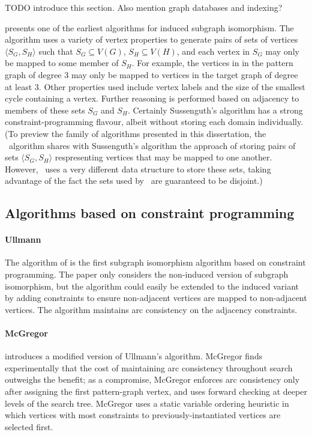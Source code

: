 TODO introduce this section. Also mention graph databases and indexing?

\citet{sussenguth1965graph} presents one of the earliest algorithms for
induced subgraph isomorphism.  The algorithm uses a variety of vertex properties
to generate pairs of sets of vertices $\langle S_G, S_H \rangle$
such that $S_G \subseteq V(G)$, $S_H \subseteq V(H)$,
and each vertex in $S_G$ may only be mapped to some member of $S_H$.
For example, the vertices in in the pattern graph of degree 3 may only be mapped to vertices
in the target graph of degree at least 3.  Other properties used include
vertex labels and the size of the smallest cycle containing a vertex.
Further reasoning is performed based on adjacency to members of these
sets $S_G$ and $S_H$.  Certainly Sussenguth's algorithm has a strong
constraint-programming flavour, albeit without storing each domain
individually.  (To preview the family of algorithms presented
in this dissertation, the \McSplit\ algorithm shares with Sussenguth's
algorithm the approach of storing
pairs of sets $\langle S_G, S_H \rangle$ respresenting vertices
that may be mapped to one another. However, \McSplit\ uses a very different
data structure to store these sets, taking advantage of the fact the
sets used by \McSplit\ are guaranteed to be disjoint.)

\subsection{Algorithms based on constraint programming}

\paragraph*{Ullmann} 
The algorithm of \citet{ullmann1976algorithm} 
is the first subgraph isomorphism algorithm based on constraint programming.
The paper only considers the non-induced version of subgraph isomorphism,
but the algorithm could easily be extended to the induced variant by adding
constraints to ensure non-adjacent vertices are mapped to non-adjacent vertices.
The algorithm maintains arc consistency on the adjacency constraints.

\paragraph*{McGregor}
\citet{DBLP:journals/isci/McGregor79} introduces a modified version of
Ullmann's algorithm.  McGregor finds experimentally that the cost of maintaining
arc consistency throughout search outweighs the benefit; as a compromise,
McGregor enforces arc consistency only after assigning the first pattern-graph
vertex, and uses forward checking at deeper levels of the search tree.
McGregor uses a static variable ordering heuristic in which vertices
with most constraints to previously-instantiated vertices are selected first.

